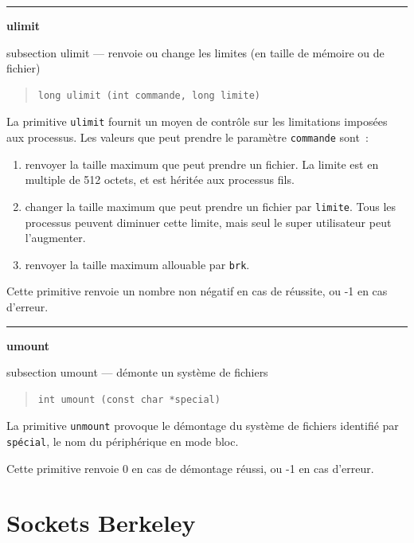 \documentclass [twoside] {report}
\newcommand {\primitive} [1]
    {
	\phantomsection
	{\large \textbf {#1}}
	\addcontentsline {toc} {subsection} {#1}
    }
\newcommand {\separation}
    {
	\vspace {5mm}
	\nopagebreak
	\hrule
    }
\begin{document}
\separation
\primitive {ulimit} --- renvoie ou change les limites (en taille de mémoire ou de fichier)

\begin {quote}
\begin {verbatim}
long ulimit (int commande, long limite)
\end{verbatim}
\end {quote}

La primitive \texttt {ulimit} fournit un moyen de
contrôle sur les limitations imposées aux
processus. Les valeurs que peut prendre le
paramètre \texttt {commande} sont~:

\begin {enumerate}
    \item renvoyer la taille maximum que peut prendre
	un fichier. La limite est en multiple de 512
	octets, et est héritée aux processus fils.
    \item changer la taille maximum que peut prendre
	un fichier par \texttt {limite}. Tous les processus
	peuvent diminuer cette limite, mais seul le super
	utilisateur peut l'augmenter.
    \item renvoyer la taille maximum allouable par \texttt {brk}.
\end {enumerate}

Cette primitive renvoie un nombre non négatif en
cas de réussite, ou -1 en cas d'erreur.




\separation
\primitive {umount} --- démonte un système de fichiers

\begin {quote}
\begin {verbatim}
int umount (const char *special)
\end{verbatim}
\end {quote}

La primitive \texttt {unmount} provoque le démontage du
système de fichiers identifié par \texttt {spécial}, le nom du
périphérique en mode bloc.

Cette primitive renvoie 0 en cas de démontage
réussi, ou -1 en cas d'erreur.





\section {Sockets Berkeley}
\end{document}
